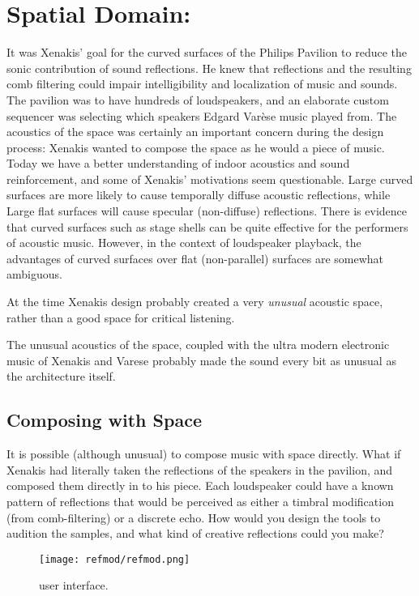 \chapter{Spatial Domain: }
\label{ch:ref-mod}

It was Xenakis' goal for the curved surfaces of the Philips Pavilion
to reduce the sonic contribution of sound
reflections.\cite{philips1958} He knew that reflections and the
resulting comb filtering could impair intelligibility and localization
of music and sounds.  The pavilion was to have hundreds of
loudspeakers, and an elaborate custom sequencer was selecting which
speakers Edgard Var\`{e}se music played from. The acoustics of the
space was certainly an important concern during the design process:
Xenakis wanted to compose the space as he would a piece of music.
Today we have a better understanding of indoor acoustics and sound
reinforcement, and some of Xenakis' motivations seem
questionable. Large curved surfaces are more likely to cause
temporally diffuse acoustic reflections, while Large flat surfaces
will cause specular (non-diffuse) reflections. There is evidence that
curved surfaces such as stage shells can be quite effective for the
performers of acoustic music.\cite{DAntonio1991} However, in the
context of loudspeaker playback, the advantages of curved surfaces
over flat (non-parallel) surfaces are somewhat
ambiguous.\cite{Cox2006} 

At the time Xenakis design probably created a very \emph{unusual} acoustic
space, rather than a good space for critical listening. 

The unusual acoustics of the space, coupled with the ultra modern
electronic music of Xenakis and Varese probably made the sound every
bit as unusual as the architecture itself. 


\section{Composing with Space}
\label{sec:composing-with-space}
It is possible (although unusual) to compose music with space
directly. What if Xenakis had literally taken the reflections of the
speakers in the pavilion, and composed them directly in to his
piece. Each loudspeaker could have a known pattern of reflections that
would be perceived as either a timbral modification (from
comb-filtering) or a discrete echo. How would you design the tools to
audition the samples, and what kind of creative reflections could you
make? 

\begin{figure*}[]
  \texttt{[image: refmod/refmod.png]}
  \caption[Tempo Transition]{ user interface.}
  \label{fig:basic-tempo-change}
\end{figure*}


